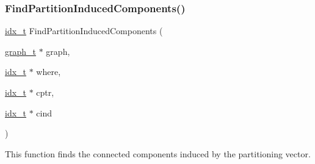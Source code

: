 \subsubsection{\texorpdfstring{Find\+Partition\+Induced\+Components()}{FindPartitionInducedComponents()}}
{\footnotesize\ttfamily \hyperlink{a00876_aaa5262be3e700770163401acb0150f52}{idx\+\_\+t} Find\+Partition\+Induced\+Components (\begin{DoxyParamCaption}\item[{\hyperlink{a00734}{graph\+\_\+t} $\ast$}]{graph,  }\item[{\hyperlink{a00876_aaa5262be3e700770163401acb0150f52}{idx\+\_\+t} $\ast$}]{where,  }\item[{\hyperlink{a00876_aaa5262be3e700770163401acb0150f52}{idx\+\_\+t} $\ast$}]{cptr,  }\item[{\hyperlink{a00876_aaa5262be3e700770163401acb0150f52}{idx\+\_\+t} $\ast$}]{cind }\end{DoxyParamCaption})}

This function finds the connected components induced by the partitioning vector.


